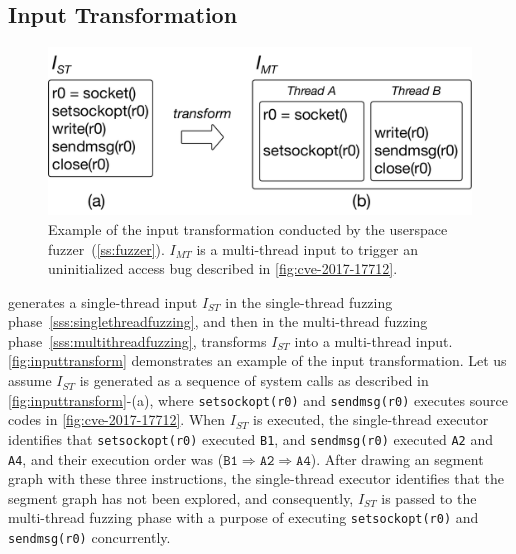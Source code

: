 \subsection{Input Transformation}
\label{s:appendix:inputtransform}


\begin{figure}[h]
  \centering
  \includegraphics[width=0.8\linewidth]{fig/inputtransform.pdf}
  \caption{Example of the input transformation conducted by the
    userspace fuzzer~(\autoref{ss:fuzzer}). $I_{MT}$ is a multi-thread
    input to trigger an uninitialized access bug described in
    \autoref{fig:cve-2017-17712}.}
  \label{fig:inputtransform}
\end{figure}

\sys generates a single-thread input $I_{ST}$ in the single-thread
fuzzing phase~\autoref{sss:singlethreadfuzzing}, and then in the
multi-thread fuzzing phase~\autoref{sss:multithreadfuzzing},
transforms $I_{ST}$ into a multi-thread input.
%
\autoref{fig:inputtransform} demonstrates an example of the input
transformation. Let us assume $I_{ST}$ is generated as a sequence of
system calls as described in \autoref{fig:inputtransform}-(a), where
\texttt{setsockopt(r0)} and \texttt{sendmsg(r0)} executes source codes
in \autoref{fig:cve-2017-17712}. When $I_{ST}$ is executed, the
single-thread executor identifies that \texttt{setsockopt(r0)}
executed \texttt{B1}, and \texttt{sendmsg(r0)} executed \texttt{A2}
and \texttt{A4}, and their execution order was
($\texttt{B1} \Rightarrow \texttt{A2} \Rightarrow \texttt{A4}$).
%
After drawing an segment graph with these three instructions, the
single-thread executor identifies that the segment graph has not been
explored, and consequently, $I_{ST}$ is passed to the multi-thread
fuzzing phase with a purpose of executing \texttt{setsockopt(r0)} and
\texttt{sendmsg(r0)} concurrently.


